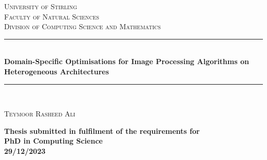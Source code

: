 %
%
%
	\begin{titlepage}
		
		\newcommand{\HRule}{\rule{\linewidth}{0.5mm}} %
		
		\center %
		
		
		\textsc{\LARGE University of Stirling}\\[1.5cm] %
		\textsc{\Large Faculty of Natural Sciences}\\[0.5cm] %
		\textsc{\large Division of Computing Science and Mathematics}\\[3.5cm] 
		
		
		\HRule \\[0.4cm]
		{ \huge \bfseries Domain-Specific Optimisations for Image Processing Algorithms on Heterogeneous Architectures}\\[1cm] %
		\HRule \\[1cm]
		
		
		\begin{center} \Large
			\textsc{Teymoor Rasheed Ali} %
		\end{center} 
		\bigskip
			
		
		\begin{center}\bf
			Thesis submitted in fulfilment of the requirements for \\
			PhD in Computing Science \\[1em]  
		\hfill \break
		    \large 29/12/2023 \\
	   \end{center} 	
		

\end{titlepage}
